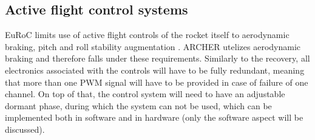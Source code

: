 \documentclass[fontsize=11pt,%
twoside,%
BCOR          = 8mm, %
DIV           = 11,  %
titlepage     = off,%
index=totoc,%
xcolor        = pdftex,%
dvipsnames,%
bibliography  = totoc,%
bibliography = numbered, %
listof        = notnumbered]{scrreprt}
\begin{document}
\subsection{Active flight control systems}
EuRoC limits use of active flight controls of the rocket itself to aerodynamic braking, pitch and roll stability augmentation \cite[p.~45]{EurocRules}. ARCHER utelizes aerodynamic braking and therefore falls under these requirements. Similarly to the recovery, all electronics associated with the controls will have to be fully redundant\cite[p.~47]{EurocRules}, meaning that more than one PWM signal will have to be provided in case of failure of one channel. On top of that, the control system will need to have an adjustable dormant phase, during which the system can not be used\cite[p.~46-47]{EurocRules}, which can be implemented both in software and in hardware (only the software aspect will be discussed).
\end{document}

